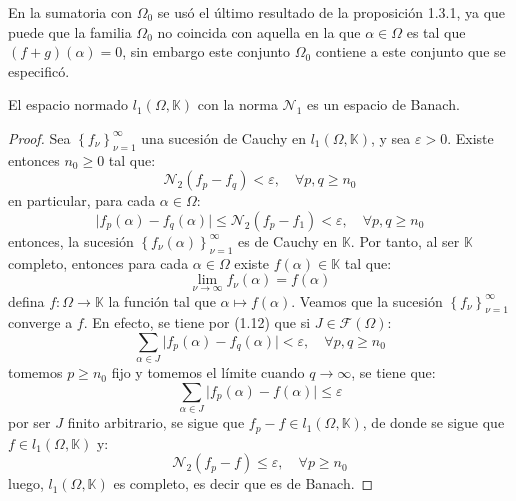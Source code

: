 \documentclass[12pt]{report}
\newcounter{it}
\theoremstyle{largebreak}
\newcommand\cf[3]{\ensuremath{#1:#2\rightarrow#3}}
\newcommand\abs[1]{\ensuremath{\big|#1\big|}}
\begin{document}
    \begin{obs}
        En la sumatoria con $\Omega_0$ se usó el último resultado de la proposición 1.3.1, ya que puede que la familia $\Omega_0$ no coincida con aquella en la que $\alpha\in\Omega$ es tal que $(f+g)(\alpha)=0$, sin embargo este conjunto $\Omega_0$ contiene a este conjunto que se especificó.
    \end{obs}

    \begin{theor}
        El espacio normado $l_1(\Omega,\mathbb{K})$ con la norma $\mathcal{N}_1$ es un espacio de Banach.
    \end{theor}

    \begin{proof}
        Sea $\left\{f_\nu \right\}_{\nu=1}^\infty$ una sucesión de Cauchy en $l_1(\Omega,\mathbb{K})$, y sea $\varepsilon>0$. Existe entonces $n_0\geq 0$ tal que:
        \begin{equation}
            \mathcal{N}_2(f_p-f_q)<\varepsilon,\quad\forall p,q\geq n_0
        \end{equation}
        en particular, para cada $\alpha\in\Omega$:
        \begin{equation*}
            \abs{f_p(\alpha)-f_q(\alpha)}\leq\mathcal{N}_2(f_p-f_1)<\varepsilon,\quad\forall p,q\geq n_0
        \end{equation*}
        entonces, la sucesión $\left\{f_\nu(\alpha) \right\}_{\nu=1}^\infty$ es de Cauchy en $\mathbb{K}$. Por tanto, al ser $\mathbb{K}$ completo, entonces para cada $\alpha\in\Omega$ existe $f(\alpha)\in\mathbb{K}$ tal que:
        \begin{equation*}
            \lim_{\nu\rightarrow\infty}f_\nu(\alpha)=f(\alpha)
        \end{equation*}
        defina $\cf{f}{\Omega}{\mathbb{K}}$ la función tal que $\alpha\mapsto f(\alpha)$. Veamos que la sucesión $\left\{f_\nu \right\}_{\nu=1}^\infty$ converge a $f$. En efecto, se tiene por (1.12) que si $J\in\mathcal{F}(\Omega)$:
        \begin{equation*}
            \sum_{ \alpha\in J}\abs{f_p(\alpha)-f_q(\alpha)}<\varepsilon,\quad\forall p,q\geq n_0
        \end{equation*}
        tomemos $p\geq n_0$ fijo y tomemos el límite cuando $q\rightarrow\infty$, se tiene que:
        \begin{equation*}
            \sum_{ \alpha\in J}\abs{f_p(\alpha)-f(\alpha)}\leq\varepsilon
        \end{equation*}
        por ser $J$ finito arbitrario, se sigue que $f_p-f\in l_1(\Omega,\mathbb{K})$, de donde se sigue que $f\in l_1(\Omega,\mathbb{K})$ y:
        \begin{equation*}
            \mathcal{N}_2(f_p-f)\leq\varepsilon,\quad\forall p\geq n_0
        \end{equation*}
        luego, $l_1(\Omega,\mathbb{K})$ es completo, es decir que es de Banach.
    \end{proof}
\end{document}
